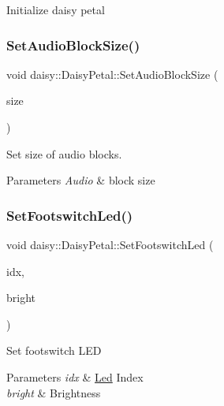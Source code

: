 \begin{DoxyCompactItemize}
Initialize daisy petal \mbox{\label{classdaisy_1_1_daisy_petal_a2356b5fdb0f87f28920c96828b2c0c93}} 
\subsubsection{\texorpdfstring{Set\+Audio\+Block\+Size()}{SetAudioBlockSize()}}
{\footnotesize\ttfamily void daisy\+::\+Daisy\+Petal\+::\+Set\+Audio\+Block\+Size (\begin{DoxyParamCaption}\item[{size\+\_\+t}]{size }\end{DoxyParamCaption})}

Set size of audio blocks. 
\begin{DoxyParams}{Parameters}
{\em Audio} & block size \\
\hline
\end{DoxyParams}
\mbox{\label{classdaisy_1_1_daisy_petal_a562d597f10b98d36bf1c37314a317d8c}} 
\subsubsection{\texorpdfstring{Set\+Footswitch\+Led()}{SetFootswitchLed()}}
{\footnotesize\ttfamily void daisy\+::\+Daisy\+Petal\+::\+Set\+Footswitch\+Led (\begin{DoxyParamCaption}\item[{Footswitch\+Led}]{idx,  }\item[{float}]{bright }\end{DoxyParamCaption})}

Set footswitch L\+ED 
\begin{DoxyParams}{Parameters}
{\em idx} & \hyperlink{classdaisy_1_1_led}{Led} Index \\
\hline
{\em bright} & Brightness \\
\hline
\end{DoxyParams}
\mbox{\label{classdaisy_1_1_daisy_petal_ad92270ffe128bc678b78be2067d4fcfe}} 

\end{DoxyCompactItemize}
